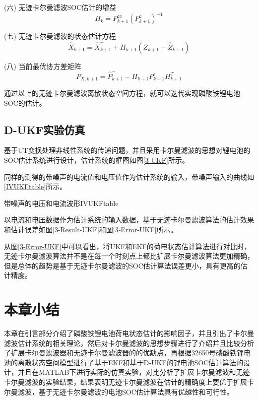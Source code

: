 (六)	无迹卡尔曼滤波SOC估计的增益
\begin{equation}
{H_k} = P_{k + 1}^{zx}{\left( {P_{k + 1}^z} \right)^{ - 1}}
\end{equation} 

(七)	无迹卡尔曼滤波的状态估计方程
\begin{equation}
{\widehat X_{k + 1}} = \widehat X_{k + 1}^ -  + {H_{k + 1}}({Z_{k + 1}} - {\widehat Z_{k + 1}})
\end{equation} 

(八)	当前最优协方差矩阵
\begin{equation}
{P_{X,k + 1}} = \widehat P_{k + 1}^ -  - {H_{k + 1}}P_{k + 1}^zH_{k + 1}^T
\end{equation} 

通过以上的无迹卡尔曼滤波离散状态空间方程，就可以迭代实现磷酸铁锂电池SOC的估计。

\subsection{D-UKF实验仿真}
基于UT变换处理非线性系统的传递问题，并且采用卡尔曼滤波的思想对锂电池的SOC估计系统进行设计，估计系统的框图如图\ref{3-UKF}所示。

同样的测得的带噪声的电流值和电压值作为估计系统的输入，带噪声输入的曲线如\ref{IVUKFtable}所示。
\begin{pics}[htbp]{带噪声的电压和电流波形}{IVUKFtable}
\end{pics}

以电流和电压数据作为估计系统的输入数据，基于无迹卡尔曼滤波算法的估计效果和估计误差如图\ref{3-Result-UKF}和图\ref{3-Error-UKF}所示。

从图\ref{3-Error-UKF}中可以看出，将UKF和EKF的荷电状态估计算法进行对比时，无迹卡尔曼滤波算法并不是在每一个时刻点上都比扩展卡尔曼滤波算法更加精确，但是总体的趋势是基于无迹卡尔曼滤波的SOC估计算法误差更小，具有更高的估计精度。
\FloatBarrier
\section{本章小结}
本章在引言部分介绍了磷酸铁锂电池荷电状态估计的影响因子，并且引出了卡尔曼滤波估计系统的相关理论，然后对卡尔曼滤波的思想步骤进行了介绍并且比较分析了扩展卡尔曼滤波器和无迹卡尔曼滤波器的的优缺点，再根据32650号磷酸铁锂电池的离散状态空间模型进行了基于EKF和基于D-UKF的锂电池SOC估计算法的设计，并且在MATLAB下进行实际的仿真实验，对比分析了扩展卡尔曼滤波和无迹卡尔曼滤波的实验结果，结果表明无迹卡尔曼滤波在估计的精确度上要优于扩展卡尔曼滤波，基于无迹卡尔曼滤波的电池SOC估计算法具有优越性和可行性。